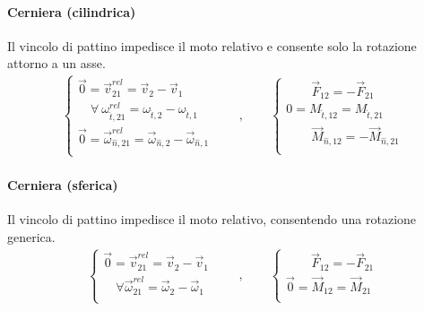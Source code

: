 \documentclass[letterpaper,10pt,italian]{jupyterBook}
\begin{document}
\paragraph{Cerniera (cilindrica)}
\label{\detokenize{ch/mechanics/actions-examples:cerniera-cilindrica}}
\sphinxAtStartPar
Il vincolo di pattino impedisce il moto relativo e consente solo la rotazione attorno a un asse.
\begin{equation*}
\begin{split}
\begin{cases}
  \vec{0} = \vec{v}^{rel}_{21}     = \vec{v}_{2}     - \vec{v}_{1} \\
  \quad \forall \ \omega^{rel}_{\hat{t},21} = \omega_{\hat{t},2} - \omega_{\hat{t},1} \\
  \vec{0} = \vec{\omega}^{rel}_{\hat{n},21} = \vec{\omega}_{\hat{n},2} - \vec{\omega}_{\hat{n},1} \\
\end{cases}
\qquad , \qquad
\begin{cases}
  \qquad \vec{F}_{12} = - \vec{F}_{21} \\
  0 =  M_{\hat{t},12} = M_{\hat{t},21} \\
  \qquad \vec{M}_{\hat{n},12} = - \vec{M}_{\hat{n},21} \\
\end{cases}
\end{split}
\end{equation*}

\paragraph{Cerniera (sferica)}
\label{\detokenize{ch/mechanics/actions-examples:cerniera-sferica}}
\sphinxAtStartPar
Il vincolo di pattino impedisce il moto relativo, consentendo una rotazione generica.
\begin{equation*}
\begin{split}
\begin{cases}
  \vec{0} = \vec{v}^{rel}_{21}     = \vec{v}_{2}     - \vec{v}_{1} \\
  \quad \forall \vec{\omega}^{rel}_{21} = \vec{\omega}_{2} - \vec{\omega}_{1} \\
\end{cases}
\qquad , \qquad
\begin{cases}
  \qquad \vec{F}_{12} = - \vec{F}_{21} \\
  \vec{0} =  \vec{M}_{12} = \vec{M}_{21} \\
\end{cases}
\end{split}
\end{equation*}
\end{document}
